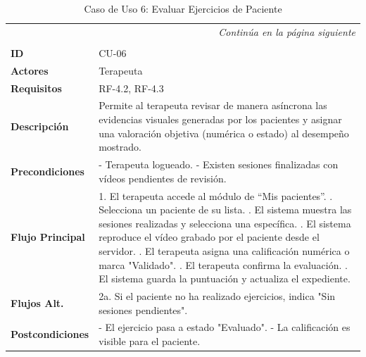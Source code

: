 \clearpage
\begin{longtable}{p{} p{}}
    \toprule
    \endfirsthead
    \toprule
    \endhead
    \midrule
    \multicolumn{2}{r}{\small\itshape Continúa en la página siguiente} \\
    \endfoot
    \bottomrule
    \noalign{\vspace{0.5cm}}
    \caption{Caso de Uso 6: Evaluar Ejercicios de Paciente} \label{cu:6} \\
    \endlastfoot

    \textbf{ID} & CU-06 \\ \midrule
    \textbf{Actores} & Terapeuta \\ \midrule
    \textbf{Requisitos} & RF-4.2, RF-4.3 \\ \midrule
    \textbf{Descripción} & Permite al terapeuta revisar de manera asíncrona las evidencias visuales generadas por los pacientes y asignar una valoración objetiva (numérica o estado) al desempeño mostrado. \\ \midrule
    \textbf{Precondiciones} & 
    - Terapeuta logueado. \newline
    - Existen sesiones finalizadas con vídeos pendientes de revisión. \\ \midrule
    \textbf{Flujo Principal} & 
    1. El terapeuta accede al módulo de “Mis pacientes”. \newline
    2. Selecciona un paciente de su lista. \newline
    3. El sistema muestra las sesiones realizadas y selecciona una específica. \newline
    4. El sistema reproduce el vídeo grabado por el paciente desde el servidor. \newline
    5. El terapeuta asigna una calificación numérica o marca "Validado". \newline
    6. El terapeuta confirma la evaluación. \newline
    7. El sistema guarda la puntuación y actualiza el expediente. \\ \midrule
    \textbf{Flujos Alt.} & 
    2a. Si el paciente no ha realizado ejercicios, indica "Sin sesiones pendientes". \\ \midrule
    \textbf{Postcondiciones} & 
    - El ejercicio pasa a estado "Evaluado". \newline
    - La calificación es visible para el paciente. \\
\end{longtable}



